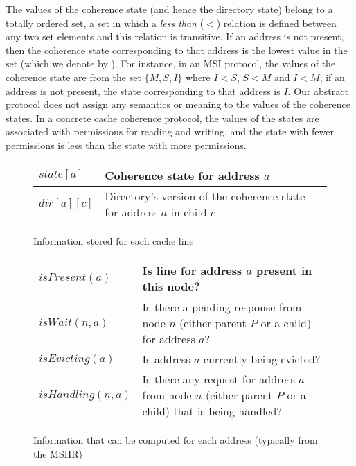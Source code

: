 The values of the coherence state (and hence the directory state) belong to a
totally ordered set, \ie a set in which a \emph{less than} ($<$) relation is
defined between any two set elements and this relation is transitive. If an
address is not present, then the coherence state corresponding to that address
is the lowest value in the set (which we denote by \Inv). For instance, in an
MSI protocol, the values of the coherence state are from the set $\{M, S, I\}$
where $I < S$, $S < M$ and $I < M$; if an address is not present, the state
corresponding to that address is $I$. Our abstract protocol does not assign any
semantics or meaning to the values of the coherence states. In a concrete cache
coherence protocol, the values of the states are associated with permissions
for reading and writing, and the state with fewer permissions is less than the
state with more permissions.

\begin{figure}\centering
\begin{tabularx}{\linewidth}{|l|X|}
\hline
$state[a]$ & Coherence state for address $a$\\
\hline
$dir[a][c]$ & Directory's version of the coherence state for address $a$ in child
$c$\\
\hline
\end{tabularx}
\caption{Information stored for each cache line}
\label{table:storage}
\end{figure}

\begin{figure}\centering
\begin{tabularx}{\linewidth}{|l|X|}
\hline
$isPresent(a)$ & Is line for address $a$ present in this node?\\
\hline
$isWait(n, a)$ & Is there a pending response from node $n$ (either parent $P$
or a child) for address $a$?\\
\hline
$isEvicting(a)$ & Is address $a$ currently being evicted?\\
\hline
$isHandling(n, a)$ & Is there any request for address $a$ from node $n$ (either
parent $P$ or a child) that is being handled?\\
\hline
\end{tabularx}
\caption{Information that can be computed for each address (typically from the
MSHR)}
\label{table:functions}
\end{figure}

